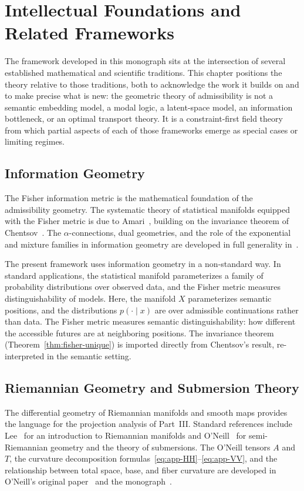 \documentclass[12pt, oneside]{book}
\theoremstyle{plain-flyxion}
\theoremstyle{definition-flyxion}
\begin{document}
\chapter{Intellectual Foundations and Related Frameworks}

The framework developed in this monograph sits at the intersection of several established
mathematical and scientific traditions. This chapter positions the theory relative to
those traditions, both to acknowledge the work it builds on and to make precise what is
new: the geometric theory of admissibility is not a semantic embedding model, a modal
logic, a latent-space model, an information bottleneck, or an optimal transport theory.
It is a constraint-first field theory from which partial aspects of each of those
frameworks emerge as special cases or limiting regimes.

\section{Information Geometry}

The Fisher information metric is the mathematical foundation of the admissibility geometry.
The systematic theory of statistical manifolds equipped with the Fisher metric is due to
Amari~\cite{amari2016information,amari2000methods}, building on the invariance theorem of
Chentsov~\cite{cencov1982}. The $\alpha$-connections, dual geometries, and the role of
the exponential and mixture families in information geometry are developed in full
generality in~\cite{amari2000methods}.

The present framework uses information geometry in a non-standard way. In standard
applications, the statistical manifold parameterizes a family of probability distributions
over observed data, and the Fisher metric measures distinguishability of models. Here,
the manifold $X$ parameterizes semantic positions, and the distributions $p(\cdot \mid
x)$ are over admissible continuations rather than data. The Fisher metric measures
semantic distinguishability: how different the accessible futures are at neighboring
positions. The invariance theorem (Theorem~\ref{thm:fisher-unique}) is imported directly
from Chentsov's result, re-interpreted in the semantic setting.

\section{Riemannian Geometry and Submersion Theory}

The differential geometry of Riemannian manifolds and smooth maps provides the language
for the projection analysis of Part~III. Standard references include Lee~\cite{lee2018}
for an introduction to Riemannian manifolds and O'Neill~\cite{oneill1983} for semi-Riemannian
geometry and the theory of submersions. The O'Neill tensors $A$ and $T$, the curvature
decomposition formulas~\eqref{eq:app-HH}--\eqref{eq:app-VV}, and the relationship between
total space, base, and fiber curvature are developed in O'Neill's original
paper~\cite{oneill1966} and the monograph~\cite{oneill1983}.
\end{document}
